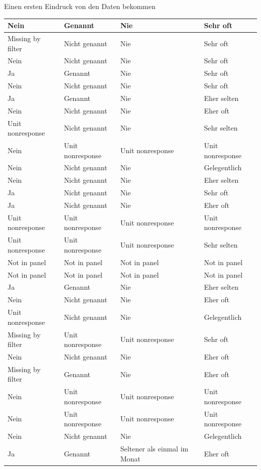 \documentclass[ignorenonframetext,]{beamer}
\begin{document}
\begin{frame}{Einen ersten Eindruck von den Daten bekommen}
\begin{tabular}{l|l|l|l}
\hline
Nein & Genannt & Nie & Sehr oft\\
\hline
Missing by filter & Nicht genannt & Nie & Sehr oft\\
\hline
Nein & Nicht genannt & Nie & Sehr oft\\
\hline
Ja & Genannt & Nie & Sehr oft\\
\hline
Nein & Nicht genannt & Nie & Sehr oft\\
\hline
Ja & Genannt & Nie & Eher selten\\
\hline
Nein & Nicht genannt & Nie & Eher oft\\
\hline
Unit nonresponse & Nicht genannt & Nie & Sehr selten\\
\hline
Nein & Unit nonresponse & Unit nonresponse & Unit nonresponse\\
\hline
Nein & Nicht genannt & Nie & Gelegentlich\\
\hline
Nein & Nicht genannt & Nie & Eher selten\\
\hline
Ja & Nicht genannt & Nie & Sehr oft\\
\hline
Ja & Nicht genannt & Nie & Eher oft\\
\hline
Unit nonresponse & Unit nonresponse & Unit nonresponse & Unit nonresponse\\
\hline
Unit nonresponse & Unit nonresponse & Unit nonresponse & Sehr selten\\
\hline
Not in panel & Not in panel & Not in panel & Not in panel\\
\hline
Not in panel & Not in panel & Not in panel & Not in panel\\
\hline
Ja & Genannt & Nie & Eher selten\\
\hline
Nein & Nicht genannt & Nie & Eher oft\\
\hline
Unit nonresponse & Nicht genannt & Nie & Gelegentlich\\
\hline
Missing by filter & Unit nonresponse & Unit nonresponse & Sehr oft\\
\hline
Nein & Nicht genannt & Nie & Eher oft\\
\hline
Missing by filter & Genannt & Nie & Eher oft\\
\hline
Nein & Unit nonresponse & Unit nonresponse & Unit nonresponse\\
\hline
Nein & Unit nonresponse & Unit nonresponse & Unit nonresponse\\
\hline
Nein & Nicht genannt & Nie & Gelegentlich\\
\hline
Ja & Genannt & Seltener als einmal im Monat & Eher oft\\

\end{tabular}
\end{frame}
\end{document}
